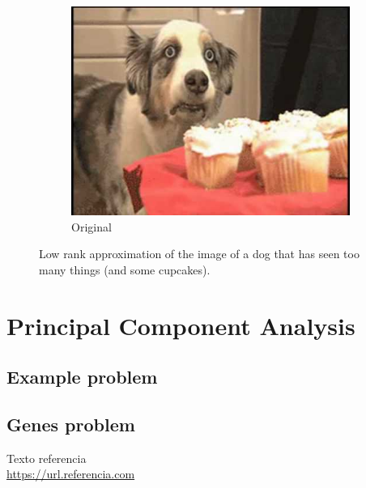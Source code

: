 \documentclass[11pt,a4paper]{article}
\begin{document}
\begin{figure}[H]
\begin{subfigure}[t]{.5\textwidth}
    \includegraphics[scale=0.3]{img/me_in_nla}
    \caption{Original}
  \end{subfigure}%
  \caption{Low rank approximation of the image of a dog that has seen too many things (and some cupcakes).}
  \label{fig:dog-lr-approximation}
\end{figure}


\section{Principal Component Analysis}

\subsection{Example problem}

\subsection{Genes problem}

\newpage

\begin{thebibliography}{5}

Texto referencia
\\\url{https://url.referencia.com}

\end{thebibliography}
\end{document}
